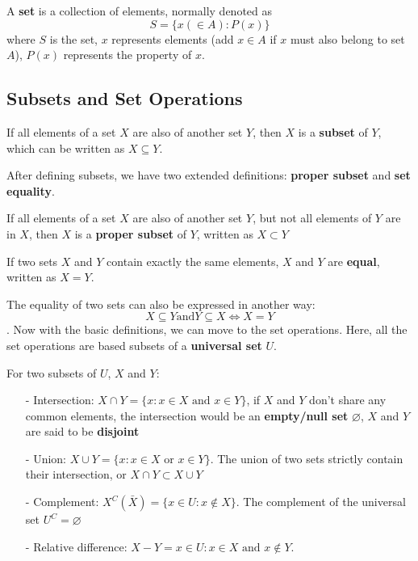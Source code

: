 A \textbf{set} is a collection of elements, normally denoted as
$$
S = \{x (\in A):P(x)\}
$$
where $S$ is the set, $x$ represents elements (add $x\in A$ if $x$ must also belong to set $A$), $P(x)$ represents the property of $x$.

\subsection{Subsets and Set Operations}
\begin{definition}
    If all elements of a set $X$ are also of another set $Y$, then $X$ is a \textbf{subset} of $Y$, which can be written as $X\subseteq Y$.
\end{definition}

After defining subsets, we have two extended definitions: \textbf{proper subset} and \textbf{set equality}.
\begin{definition}
    If all elements of a set $X$ are also of another set $Y$, but not all elements of $Y$ are in $X$, then $X$ is a \textbf{proper subset} of $Y$, written as $X \subset Y$
\end{definition}
\begin{definition}
    If two sets $X$ and $Y$ contain exactly the same elements, $X$ and $Y$ are \textbf{equal}, written as $X=Y$.
\end{definition}

The equality of two sets can also be expressed in another way: $$ X\subseteq Y \text{and} Y\subseteq X \Leftrightarrow X=Y$$.
Now with the basic definitions, we can move to the set operations. Here, all the set operations are based subsets of a \textbf{universal set} $U$.
\begin{definition}\label{def_subset}
    For two subsets of $U$, $X$ and $Y$:
    \begin{enumerate}
        \item[-] Intersection: $X\cap Y=\{x:x\in X \text{ and } x\in Y\}$, if $X$ and $Y$ don't share any common elements, the intersection would be 
        an \textbf{empty/null set} $\varnothing$, $X$ and $Y$ are said to be \textbf{disjoint}
        \item[-] Union: $X\cup Y = \{x:x\in X \text{ or } x\in Y \}$. The union of two sets strictly contain their intersection, or $X\cap Y \subset X\cup Y$
        \item[-] Complement: $X^C(\bar{X}) = \{x\in U:x\notin X\}$. The complement of the universal set $U^C=\varnothing$
        \item[-] Relative difference: $X-Y = {x\in U:x\in X \text{ and } x\notin Y}$.
    \end{enumerate}
\end{definition}

